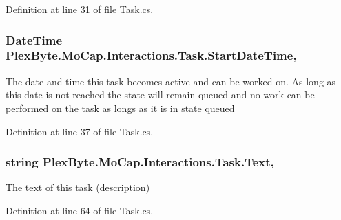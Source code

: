 Definition at line 31 of file Task.\+cs.

\subsubsection[{\texorpdfstring{Start\+Date\+Time}{StartDateTime}}]{\setlength{\rightskip}{0pt plus 5cm}Date\+Time Plex\+Byte.\+Mo\+Cap.\+Interactions.\+Task.\+Start\+Date\+Time\hspace{0.3cm}{\ttfamily [get]}, {\ttfamily [set]}}\hypertarget{class_plex_byte_1_1_mo_cap_1_1_interactions_1_1_task_a3b4287e83b9825d68a583ad68ec60b65}{}\label{class_plex_byte_1_1_mo_cap_1_1_interactions_1_1_task_a3b4287e83b9825d68a583ad68ec60b65}


The date and time this task becomes active and can be worked on. As long as this date is not reached the state will remain queued and no work can be performed on the task as longs as it is in state queued 



Definition at line 37 of file Task.\+cs.

\subsubsection[{\texorpdfstring{Text}{Text}}]{\setlength{\rightskip}{0pt plus 5cm}string Plex\+Byte.\+Mo\+Cap.\+Interactions.\+Task.\+Text\hspace{0.3cm}{\ttfamily [get]}, {\ttfamily [set]}}\hypertarget{class_plex_byte_1_1_mo_cap_1_1_interactions_1_1_task_ad80addfa475e483ae816bbd1bd199bf9}{}\label{class_plex_byte_1_1_mo_cap_1_1_interactions_1_1_task_ad80addfa475e483ae816bbd1bd199bf9}


The text of this task (description) 



Definition at line 64 of file Task.\+cs.

